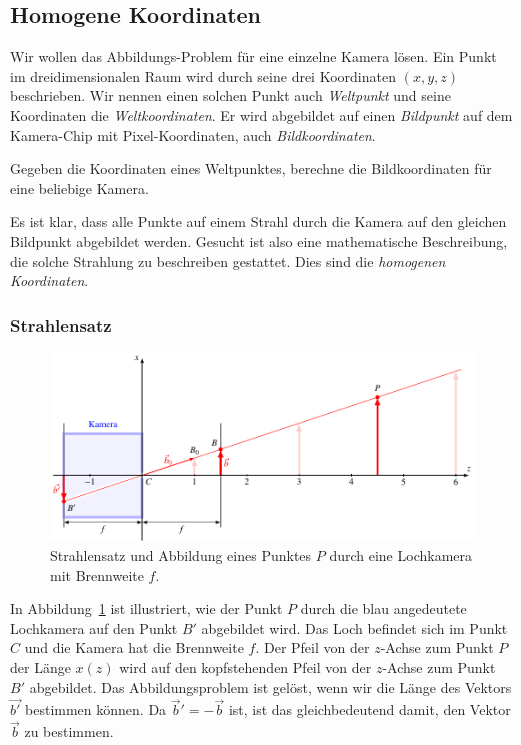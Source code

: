 %
%
%
\subsection{Homogene Koordinaten\label{section:homogene koordinaten}}
Wir wollen das Abbildungs-Problem für eine einzelne Kamera lösen.
Ein Punkt im dreidimensionalen Raum wird durch seine drei Koordinaten
$(x,y,z)$ beschrieben.
Wir nennen einen solchen Punkt auch {\em Weltpunkt} und seine Koordinaten
die {\em Weltkoordinaten}.
%
%
Er wird abgebildet auf einen {\em Bildpunkt} auf dem Kamera-Chip mit
Pixel-Koordinaten, auch {\em Bildkoordinaten}.
%
%
\begin{aufgabe}
Gegeben die Koordinaten eines Weltpunktes, berechne die Bildkoordinaten
für eine beliebige Kamera.
\end{aufgabe}
Es ist klar, dass alle Punkte auf einem Strahl durch die Kamera auf den
gleichen Bildpunkt abgebildet werden.
Gesucht ist also eine mathematische Beschreibung, die solche Strahlung
zu beschreiben gestattet.
Dies sind die {\em homogenen Koordinaten}.

\subsubsection{Strahlensatz}
\begin{figure}
\centering
\includegraphics{applications/kamera/strahlensatz.pdf}
\caption{Strahlensatz und Abbildung eines Punktes $P$ durch eine Lochkamera
mit Brennweite $f$.
\label{skript:kamera:strahlensatz}}
\end{figure}
In Abbildung~\ref{skript:kamera:strahlensatz} ist illustriert, wie
der Punkt $P$ durch die blau angedeutete Lochkamera auf den Punkt $B'$
abgebildet wird.
Das Loch befindet sich im Punkt $C$ und die Kamera hat die Brennweite $f$.
Der Pfeil von der $z$-Achse zum Punkt $P$ der Länge $x(z)$ wird
auf den kopfstehenden Pfeil von der $z$-Achse zum Punkt $B'$ abgebildet.
Das Abbildungsproblem ist gelöst, wenn wir die Länge des Vektors $\vec{b'}$
bestimmen können.
Da $\vec{b}'=-\vec{b}$ ist, ist das gleichbedeutend damit, den Vektor $\vec{b}$
zu bestimmen.

